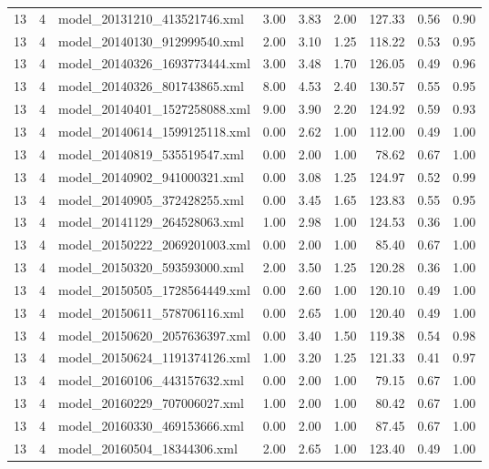 \begin{table}[ht]
\begin{tabular}{rrlrrrrrr}
   13 &   4 & model\_20131210\_413521746.xml & 3.00 & 3.83 & 2.00 & 127.33 & 0.56 & 0.90 \\ 
   13 &   4 & model\_20140130\_912999540.xml & 2.00 & 3.10 & 1.25 & 118.22 & 0.53 & 0.95 \\ 
   13 &   4 & model\_20140326\_1693773444.xml & 3.00 & 3.48 & 1.70 & 126.05 & 0.49 & 0.96 \\ 
   13 &   4 & model\_20140326\_801743865.xml & 8.00 & 4.53 & 2.40 & 130.57 & 0.55 & 0.95 \\ 
   13 &   4 & model\_20140401\_1527258088.xml & 9.00 & 3.90 & 2.20 & 124.92 & 0.59 & 0.93 \\ 
   13 &   4 & model\_20140614\_1599125118.xml & 0.00 & 2.62 & 1.00 & 112.00 & 0.49 & 1.00 \\ 
   13 &   4 & model\_20140819\_535519547.xml & 0.00 & 2.00 & 1.00 & 78.62 & 0.67 & 1.00 \\ 
   13 &   4 & model\_20140902\_941000321.xml & 0.00 & 3.08 & 1.25 & 124.97 & 0.52 & 0.99 \\ 
   13 &   4 & model\_20140905\_372428255.xml & 0.00 & 3.45 & 1.65 & 123.83 & 0.55 & 0.95 \\ 
   13 &   4 & model\_20141129\_264528063.xml & 1.00 & 2.98 & 1.00 & 124.53 & 0.36 & 1.00 \\ 
   13 &   4 & model\_20150222\_2069201003.xml & 0.00 & 2.00 & 1.00 & 85.40 & 0.67 & 1.00 \\ 
   13 &   4 & model\_20150320\_593593000.xml & 2.00 & 3.50 & 1.25 & 120.28 & 0.36 & 1.00 \\ 
   13 &   4 & model\_20150505\_1728564449.xml & 0.00 & 2.60 & 1.00 & 120.10 & 0.49 & 1.00 \\ 
   13 &   4 & model\_20150611\_578706116.xml & 0.00 & 2.65 & 1.00 & 120.40 & 0.49 & 1.00 \\ 
   13 &   4 & model\_20150620\_2057636397.xml & 0.00 & 3.40 & 1.50 & 119.38 & 0.54 & 0.98 \\ 
   13 &   4 & model\_20150624\_1191374126.xml & 1.00 & 3.20 & 1.25 & 121.33 & 0.41 & 0.97 \\ 
   13 &   4 & model\_20160106\_443157632.xml & 0.00 & 2.00 & 1.00 & 79.15 & 0.67 & 1.00 \\ 
   13 &   4 & model\_20160229\_707006027.xml & 1.00 & 2.00 & 1.00 & 80.42 & 0.67 & 1.00 \\ 
   13 &   4 & model\_20160330\_469153666.xml & 0.00 & 2.00 & 1.00 & 87.45 & 0.67 & 1.00 \\ 
   13 &   4 & model\_20160504\_18344306.xml & 2.00 & 2.65 & 1.00 & 123.40 & 0.49 & 1.00 \\ 

\end{tabular}
\end{table}
